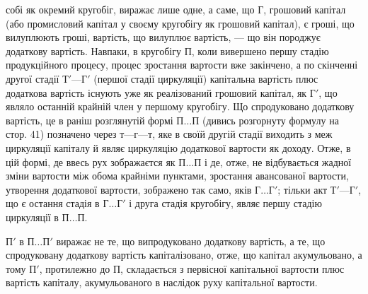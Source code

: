 \parcont{}  %
собі як окремий кругобіг, виражає лише одне, а саме, що $Г$, грошовий
капітал (або промисловий капітал у своєму кругобігу як грошовий
капітал), є гроші, що вилуплюють гроші, вартість, що вилуплює вартість,
— що він породжує додаткову вартість. Навпаки, в кругобігу $П$,
коли вивершено першу стадію продукційного процесу, процес зростання
вартости вже закінчено, а по скінченні другої стадії $Т' — Г'$ (першої
стадії циркуляції) капітальна вартість плюс додаткова вартість існують
уже як реалізований грошовий капітал, як $Г'$, що являло останній крайній
член у першому кругобігу. Що спродуковано додаткову вартість, це в
раніш розглянутій формі $П\dots{}П$ (дивись розгорнуту формулу на стор.
41) позначено через $т — г — т$, яке в своїй другій стадії виходить
з меж циркуляції капіталу й являє циркуляцію додаткової вартости як
доходу. Отже, в цій формі, де ввесь рух зображаєтся як $П\dots{} П$ і де,
отже, не відбувається жадної зміни вартости між обома крайніми пунктами,
зростання авансованої вартости, утворення додаткової вартости, зображено
так само, яків $Г\dots{} Г'$; тільки акт $Т' — Г'$, що є остання стадія в $Г\dots{} Г'$
і друга стадія кругобігу, являє першу стадію циркуляції в $П\dots{}П$.

$П'$ в $П\dots{}П'$ виражає не те, що випродуковано додаткову вартість, а
те, що спродуковану додаткову вартість капіталізовано, отже, що капітал
акумульовано, а тому $П'$, протилежно до $П$, складається з первісної капітальної
вартости плюс вартість капіталу, акумульованого в наслідок руху
капітальної вартости.

